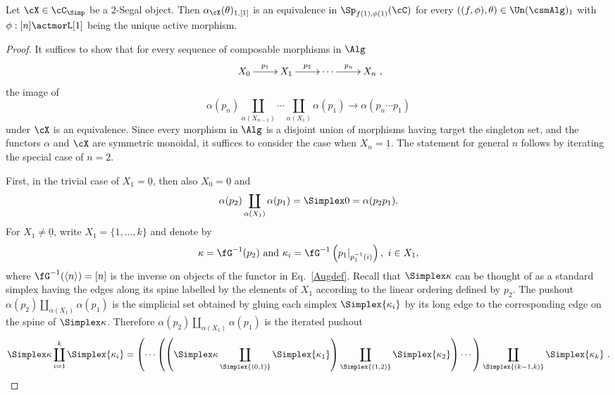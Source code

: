 \documentclass[a4paper]{article}
\numberwithin{equation}{section}
\begin{document}
\begin{lem}
 \label{sublemtwo}
 Let $\cX \in \cC_\Simp$ be a $2$-Segal object. Then $\alpha_\cX(\theta)_{1,[1]}$ is an equivalence in $\Sp_{f(1),\phi(1)}(\cC)$ for every $\left((f,\phi), \theta\right) \in \Un(\csmAlg)_1$ with $\phi:[n]\actmorL [1]$ being the unique active morphism.
\end{lem}
\begin{proof}
It suffices to show that for every sequence of composable morphisms in $\Alg$
\begin{equation*}
 \xymatrix{X_0 \ar[r]^-{p_1} & X_1 \ar[r]^-{p_2} & \cdots \ar[r]^{p_n} & X_n},
\end{equation*}
the image of
\begin{equation*}
 \alpha(p_n) \coprod_{\alpha(X_{n-1})} \cdots \coprod_{\alpha(X_1)} \alpha(p_1) \to \alpha(p_n\cdots p_1)
\end{equation*}
under $\cX$ is an equivalence. Since every morphism in $\Alg$ is a disjoint union of morphisms having target the singleton set, and the functors $\alpha$ and $\cX$ are symmetric monoidal, it suffices to consider the case when $X_n = \underline{1}$. The statement for general $n$ follows by iterating the special case of $n=2$.

First, in the trivial case of $X_1 = \underline{0}$, then also $X_0=\underline{0}$ and
\begin{equation*}
 \alpha(p_2)\coprod_{\alpha(X_1)} \alpha(p_1) = \Simplex 0 = \alpha(p_2p_1).
\end{equation*}
For $X_1 \neq \underline{0}$, write $X_1 = \{1,\ldots,k\}$ and denote by
\begin{equation*}
\kappa = \fG^{-1} (p_2)\  {\rm and} \ \kappa_i = \fG^{-1} \left(p_1|_{p_1^{-1}(i)}\right), \ i \in X_1,
\end{equation*}
where $\fG^{-1}(\langle n \rangle) = [n]$ is the inverse on objects of the functor in Eq.~\ref{Augdef}. Recall that $\Simplex \kappa$ can be thought of as a standard simplex having the edges along its spine labelled by the elements of $X_1$ according to the linear ordering defined by $p_2$. The pushout $\alpha(p_2) \coprod_{\alpha(X_1)} \alpha(p_1)$ is the simplicial set obtained by gluing each simplex $\Simplex{\kappa_i}$ by its long edge to the corresponding edge on the spine of $\Simplex \kappa$. Therefore $\alpha(p_2) \coprod_{\alpha(X_1)} \alpha(p_1)$ is the iterated pushout
\begin{equation*}
 \Simplex \kappa \coprod_{i=1}^k \Simplex{\kappa_i} =\left( \cdots \left(\left(\Simplex \kappa \coprod_{\Simplex{(0,1)}} \Simplex{\kappa_1}\right) \coprod_{\Simplex{(1,2)}} \Simplex{\kappa_2} \right) \cdots \right)\coprod_{\Simplex{(k-1,k)}} \Simplex{\kappa_k}\ .
\end{equation*}


\end{proof}
\end{document}

